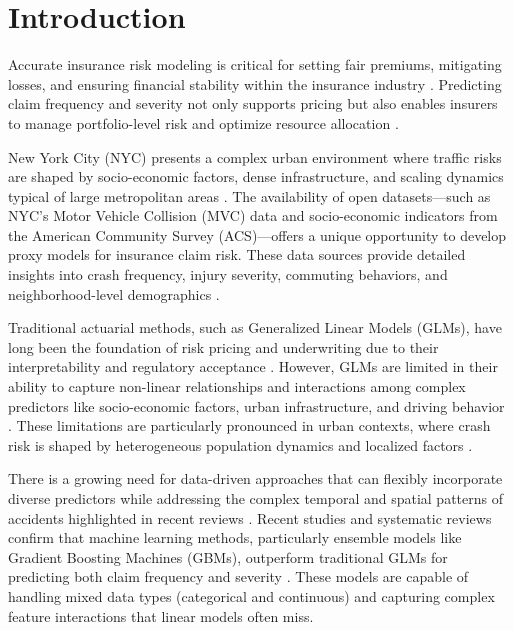 \documentclass[
  number,
  review,
  3p]{elsarticle}
\begin{document}
\section{Introduction}\label{introduction}

Accurate insurance risk modeling is critical for setting fair premiums,
mitigating losses, and ensuring financial stability within the insurance
industry \citep{henckaerts, clemente}. Predicting claim frequency and
severity not only supports pricing but also enables insurers to manage
portfolio-level risk and optimize resource allocation \citep{mohamed}.

New York City (NYC) presents a complex urban environment where traffic
risks are shaped by socio-economic factors, dense infrastructure, and
scaling dynamics typical of large metropolitan areas
\citep{cabrera, bettencourt}. The availability of open datasets---such
as NYC's Motor Vehicle Collision (MVC) data and socio-economic
indicators from the American Community Survey (ACS)---offers a unique
opportunity to develop proxy models for insurance claim risk. These data
sources provide detailed insights into crash frequency, injury severity,
commuting behaviors, and neighborhood-level demographics
\citep{adeniyi, brubacher}.

Traditional actuarial methods, such as Generalized Linear Models (GLMs),
have long been the foundation of risk pricing and underwriting due to
their interpretability and regulatory acceptance \citep{henckaerts}.
However, GLMs are limited in their ability to capture non-linear
relationships and interactions among complex predictors like
socio-economic factors, urban infrastructure, and driving behavior
\citep{clemente}. These limitations are particularly pronounced in urban
contexts, where crash risk is shaped by heterogeneous population
dynamics and localized factors \citep{cabrera, brubacher}.

There is a growing need for data-driven approaches that can flexibly
incorporate diverse predictors while addressing the complex temporal and
spatial patterns of accidents highlighted in recent reviews
\citep{grigorev, behboudi}. Recent studies and systematic reviews
confirm that machine learning methods, particularly ensemble models like
Gradient Boosting Machines (GBMs), outperform traditional GLMs for
predicting both claim frequency and severity
\citep{clemente, mohamed, behboudi}. These models are capable of
handling mixed data types (categorical and continuous) and capturing
complex feature interactions that linear models often miss.
\end{document}
